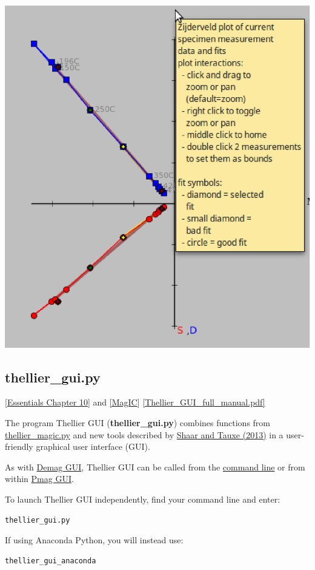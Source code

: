\documentclass[11pt]{book}
\begin{document}
{\includegraphics[width=10 cm]{EPSFiles/demag_gui_ContextHelp.eps}


\subsection{thellier\_gui.py}
\href{http://earthref.org/MAGIC/books/Tauxe/Essentials/WebBook3ch10.html#ch10}{[Essentials Chapter 10]} and \href{#MagIC}{[MagIC}]
\href{https://github.com/PmagPy/PmagPy-Cookbook/blob/gh-pages/thellier_GUI_full_manual.pdf}{[Thellier\_GUI\_full\_manual.pdf]}

The program Thellier GUI ({\bf thellier\_gui.py})  combines functions from \href{#thellier_magic.py}{thellier\_magic.py} and new tools described by  \href{http://dx.doi.org/10.1002/ggge.20062}{Shaar and Tauxe (2013)} \nocite{shaar13} in a user-friendly graphical user interface (GUI).

As with \href{#demag_gui.py}{Demag GUI}, Thellier GUI can  be called from  the  \href{#command_line}{command line} or from within \href{#pmag_gui.py}{Pmag GUI}.

To launch Thellier GUI independently, find your command line and enter:

\begin{verbatim}
thellier_gui.py
\end{verbatim}

If using Anaconda Python, you will instead use:

\begin{verbatim}
thellier_gui_anaconda
\end{verbatim}

}
\end{document}
